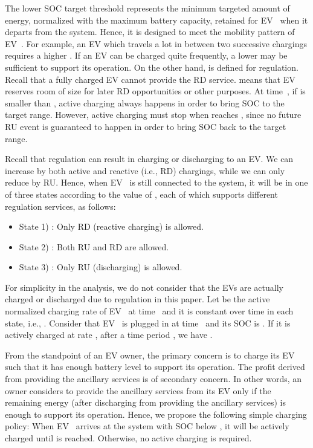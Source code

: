 \documentclass[journal]{IEEEtran}
\begin{document}
The lower SOC target threshold  represents the minimum
targeted amount of energy, normalized with the maximum battery capacity,
retained for EV~ when it departs from the system.  Hence, it is designed to
meet the mobility pattern of EV~.  For example, an EV which travels a lot in
between two successive chargings requires a higher .  If an EV
can be charged quite frequently, a lower  may be sufficient to
support its operation.  On the other hand,  is defined for
regulation.  Recall that a fully charged EV cannot provide the RD
service.   means that EV~ reserves room of size
 for later RD opportunities or other
purposes.  At time~, if  is smaller than , active
charging always happens in order to bring SOC to the target range.  However,
active charging must stop when  reaches , since no
future RU event is guaranteed to happen in order to bring SOC back
to the target range.
 
Recall that regulation can result in charging or discharging to an EV.  We can
increase  by both active and reactive (i.e., RD)
chargings, while we can only reduce  by RU.  Hence, when
EV~ is still connected to the system, it will be in one of three states
according to the value of , each of which supports different 
regulation services, as follows:
\begin{itemize}[]
\item State 1) :
Only RD (reactive charging) is allowed.

\item State 2) :
Both RU and RD are allowed.

\item State 3) :
Only RU (discharging) is allowed. 
\end{itemize} 

For simplicity in the analysis, we do not consider that the EVs are actually
charged or discharged due to regulation in this paper.  
Let  be
the active normalized charging rate of EV~ at time~ and it is constant
over time in each state, i.e., .
Consider that EV~ is plugged in
at time~ and its SOC is .  If it is actively charged at rate ,
after a time period , we have
.

From the standpoint of an EV owner, the primary concern is to charge its EV
such that it has enough battery level to support its operation.  The profit
derived from providing the ancillary services is of secondary concern.  In
other words, an owner considers to provide the ancillary services from its EV
only if the remaining energy (after discharging from providing the ancillary
services) is enough to support its operation.  Hence, we propose the following
simple charging policy: When EV~ arrives at the system with SOC below
, it will be actively charged until  is
reached.  Otherwise, no active charging is required.
\end{document}
